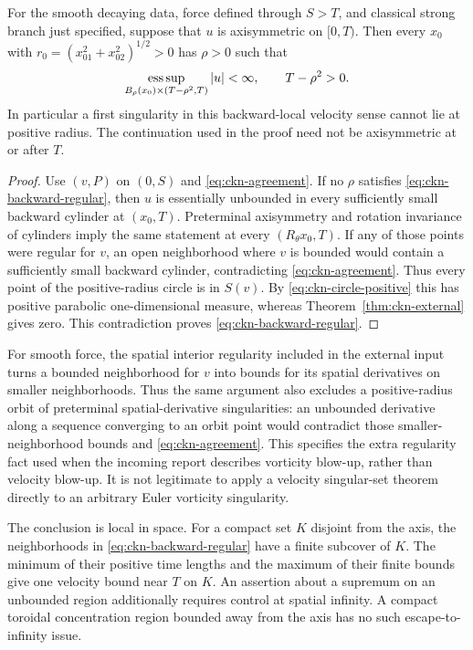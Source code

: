 \begin{theorem}
\label{thm:ckn-terminal}
For the smooth decaying data, force defined through $S>T$, and classical
strong branch just specified, suppose that $u$ is axisymmetric on
$[0,T)$. Then every $x_0$ with
$r_0=(x_{01}^2+x_{02}^2)^{1/2}>0$ has $\rho>0$ such that
\begin{equation}\label{eq:ckn-backward-regular}
 \mathop{\rm ess\,sup}_{B_\rho(x_0)\times(T-\rho^2,T)}|u|<\infty,
 \qquad T-\rho^2>0.
\end{equation}
In particular a first singularity in this backward-local velocity sense
cannot lie at positive radius. The continuation used in the proof need
not be axisymmetric at or after $T$.
\end{theorem}
\begin{proof}
Use $(v,P)$ on $(0,S)$ and \eqref{eq:ckn-agreement}. If no $\rho$
satisfies \eqref{eq:ckn-backward-regular}, then $u$ is essentially
unbounded in every sufficiently small backward cylinder at $(x_0,T)$.
Preterminal axisymmetry and rotation invariance of cylinders imply the
same statement at every $(R_\theta x_0,T)$. If any of those points were
regular for $v$, an open neighborhood where $v$ is bounded would contain
a sufficiently small backward cylinder, contradicting
\eqref{eq:ckn-agreement}. Thus every point of the positive-radius
circle is in $S(v)$. By \eqref{eq:ckn-circle-positive} this has positive
parabolic one-dimensional measure, whereas Theorem~\ref{thm:ckn-external}
gives zero. This contradiction proves \eqref{eq:ckn-backward-regular}.
\end{proof}

For smooth force, the spatial interior regularity included in the
external input turns a bounded neighborhood for $v$ into bounds for
its spatial derivatives on smaller neighborhoods. Thus the same argument
also excludes a positive-radius orbit of preterminal spatial-derivative
singularities: an unbounded derivative along a sequence converging to an
orbit point would contradict those smaller-neighborhood bounds and
\eqref{eq:ckn-agreement}. This specifies the extra regularity fact used
when the incoming report describes vorticity blow-up, rather than
velocity blow-up. It is not legitimate to apply a velocity singular-set
theorem directly to an arbitrary Euler vorticity singularity.

The conclusion is local in space. For a compact set $K$ disjoint from
the axis, the neighborhoods in \eqref{eq:ckn-backward-regular} have a
finite subcover of $K$. The minimum of their positive time lengths and
the maximum of their finite bounds give one velocity bound near $T$
on $K$. An assertion about a supremum on an unbounded region additionally
requires control at spatial infinity. A compact toroidal concentration
region bounded away from the axis has no such escape-to-infinity issue.

